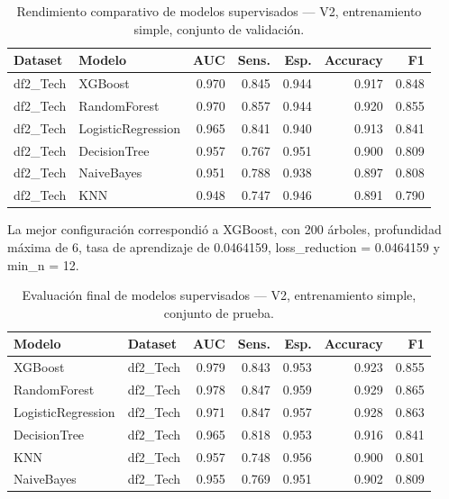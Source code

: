 \begin{table}[H]
  \centering
  \caption[V2 sin CV validación]{Rendimiento comparativo de modelos supervisados --- V2, entrenamiento simple, conjunto de validación.}
  \label{tab:v2-nocv-base}
  \scriptsize
  \begin{tabular}{llrrrrr}
    \toprule
    \textbf{Dataset} & \textbf{Modelo} & \textbf{AUC} & \textbf{Sens.} & \textbf{Esp.} & \textbf{Accuracy} & \textbf{F1} \\
    \midrule
    df2\_Tech & XGBoost            & 0.970 & 0.845 & 0.944 & 0.917 & 0.848 \\
    df2\_Tech & RandomForest       & 0.970 & 0.857 & 0.944 & 0.920 & 0.855 \\
    df2\_Tech & LogisticRegression & 0.965 & 0.841 & 0.940 & 0.913 & 0.841 \\
    df2\_Tech & DecisionTree       & 0.957 & 0.767 & 0.951 & 0.900 & 0.809 \\
    df2\_Tech & NaiveBayes         & 0.951 & 0.788 & 0.938 & 0.897 & 0.808 \\
    df2\_Tech & KNN                & 0.948 & 0.747 & 0.946 & 0.891 & 0.790 \\
    \bottomrule
  \end{tabular}
\end{table}

La mejor configuración correspondió a XGBoost, con 200 árboles, profundidad
máxima de 6, tasa de aprendizaje de 0.0464159, loss\_reduction = 0.0464159 y
min\_n = 12.

\begin{table}[H]
  \centering
  \caption[V2 sin CV prueba]{Evaluación final de modelos supervisados --- V2, entrenamiento simple, conjunto de prueba.}
  \label{tab:v2-nocv-test}
  \scriptsize
  \begin{tabular}{llrrrrr}
    \toprule
    \textbf{Modelo} & \textbf{Dataset} & \textbf{AUC} & \textbf{Sens.} & \textbf{Esp.} & \textbf{Accuracy} & \textbf{F1} \\
    \midrule
    XGBoost            & df2\_Tech & 0.979 & 0.843 & 0.953 & 0.923 & 0.855 \\
    RandomForest       & df2\_Tech & 0.978 & 0.847 & 0.959 & 0.929 & 0.865 \\
    LogisticRegression & df2\_Tech & 0.971 & 0.847 & 0.957 & 0.928 & 0.863 \\
    DecisionTree       & df2\_Tech & 0.965 & 0.818 & 0.953 & 0.916 & 0.841 \\
    KNN                & df2\_Tech & 0.957 & 0.748 & 0.956 & 0.900 & 0.801 \\
    NaiveBayes         & df2\_Tech & 0.955 & 0.769 & 0.951 & 0.902 & 0.809 \\
    \bottomrule
  \end{tabular}
\end{table}

